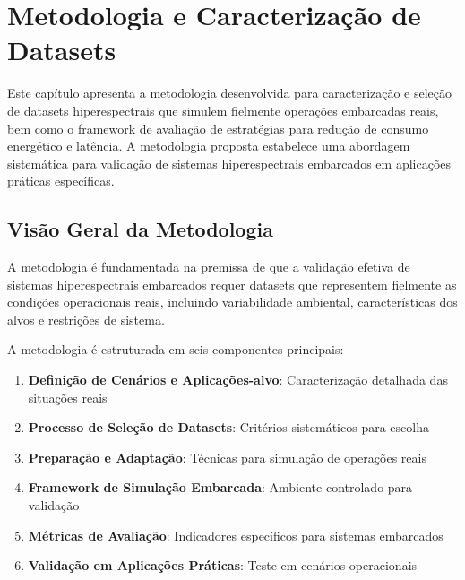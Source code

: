 \chapter{Metodologia e Caracterização de Datasets}\label{chp:metodologia}

Este capítulo apresenta a metodologia desenvolvida para caracterização e seleção de datasets hiperespectrais que simulem fielmente operações embarcadas reais, bem como o framework de avaliação de estratégias para redução de consumo energético e latência. A metodologia proposta estabelece uma abordagem sistemática para validação de sistemas hiperespectrais embarcados em aplicações práticas específicas.

\section{Visão Geral da Metodologia}\label{sec:visao_geral}

A metodologia é fundamentada na premissa de que a validação efetiva de sistemas hiperespectrais embarcados requer datasets que representem fielmente as condições operacionais reais, incluindo variabilidade ambiental, características dos alvos e restrições de sistema.


A metodologia é estruturada em seis componentes principais:

\begin{enumerate}
    \item \textbf{Definição de Cenários e Aplicações-alvo}: Caracterização detalhada das situações reais
    \item \textbf{Processo de Seleção de Datasets}: Critérios sistemáticos para escolha
    \item \textbf{Preparação e Adaptação}: Técnicas para simulação de operações reais
    \item \textbf{Framework de Simulação Embarcada}: Ambiente controlado para validação
    \item \textbf{Métricas de Avaliação}: Indicadores específicos para sistemas embarcados
    \item \textbf{Validação em Aplicações Práticas}: Teste em cenários operacionais
\end{enumerate}

